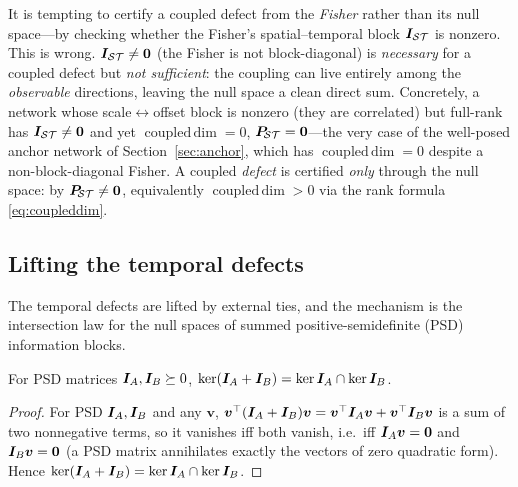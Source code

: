 \begin{remark}
\label{rem:necessary}
It is tempting to certify a coupled defect from the \emph{Fisher} rather than its null
space---by checking whether the Fisher's spatial--temporal block $\bm{I}_{\mathcal{S}\mathcal{T}}$ is
nonzero. This is wrong. $\bm{I}_{\mathcal{S}\mathcal{T}}\neq\bm0$ (the Fisher is not block-diagonal) is
\emph{necessary} for a coupled defect but \emph{not sufficient}: the coupling can live
entirely among the \emph{observable} directions, leaving the null space a clean direct sum.
Concretely, a network whose scale$\leftrightarrow$offset block is nonzero (they are
correlated) but full-rank has $\bm{I}_{\mathcal{S}\mathcal{T}}\neq\bm0$ and yet $\operatorname{coupled\,dim}=0$,
$\bm{P}_{\!\mathcal{S}\mathcal{T}}=\bm0$---the very case of the well-posed anchor network of
Section~\ref{sec:anchor}, which has $\operatorname{coupled\,dim}=0$ despite a
non-block-diagonal Fisher. A coupled \emph{defect} is certified \emph{only} through the null
space: by $\bm{P}_{\!\mathcal{S}\mathcal{T}}\neq\bm0$, equivalently $\operatorname{coupled\,dim}>0$ via the rank formula
\eqref{eq:coupleddim}.
\end{remark}

\subsection{Lifting the temporal defects}
\label{sec:lift}

The temporal defects are lifted by external ties, and the mechanism is the intersection law
for the null spaces of summed positive-semidefinite (PSD) information blocks.

\begin{lemma}
\label{lem:intersect}
For PSD matrices $\bm{I}_A,\bm{I}_B\succeq0$,
$\ker(\bm{I}_A+\bm{I}_B)=\ker\bm{I}_A\cap\ker\bm{I}_B$.
\end{lemma}

\begin{proof}
For PSD $\bm{I}_A,\bm{I}_B$ and any $\bm v$, $\bm v^\top(\bm{I}_A+\bm{I}_B)\bm v=
\bm v^\top\bm{I}_A\bm v+\bm v^\top\bm{I}_B\bm v$ is a sum of two nonnegative terms, so it
vanishes iff both vanish, i.e.\ iff $\bm{I}_A\bm v=\bm0$ and $\bm{I}_B\bm v=\bm0$ (a PSD matrix
annihilates exactly the vectors of zero quadratic form). Hence
$\ker(\bm{I}_A+\bm{I}_B)=\ker\bm{I}_A\cap\ker\bm{I}_B$.
\end{proof}

